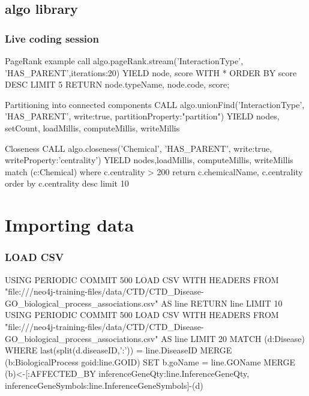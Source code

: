 \documentclass[12pt]{beamer}
\begin{document}
    \subsection{algo library}
    \begin{frame}
        \frametitle{Live coding session}
        \begin{block}{PageRank example}
            call algo.pageRank.stream('InteractionType', 'HAS\_PARENT',{iterations:20}) YIELD node, score
            WITH * ORDER BY score DESC LIMIT 5
            RETURN node.typeName, node.code, score;
        \end{block}
        \begin{block}{Partitioning into connected components}
            CALL algo.unionFind('InteractionType', 'HAS\_PARENT', {write:true, partitionProperty:"partition"})
            YIELD nodes, setCount, loadMillis, computeMillis, writeMillis
        \end{block}
        \begin{block}{Closeness}%
            CALL algo.closeness('Chemical', 'HAS\_PARENT', {write:true, writeProperty:'centrality'})
            YIELD nodes,loadMillis, computeMillis, writeMillis\\
            
            match (c:Chemical) where c.centrality > 200 return c.chemicalName, c.centrality order by c.centrality desc limit 10
        \end{block}
    \end{frame}
    
    \section{Importing data}
    \begin{frame}
        \frametitle{LOAD CSV}
        USING PERIODIC COMMIT 500
        LOAD CSV WITH HEADERS FROM "file:///neo4j-training-files/data/CTD/CTD\_Disease-GO\_biological\_process\_associations.csv" AS line
        RETURN line LIMIT 10\\
        
        USING PERIODIC COMMIT 500
        LOAD CSV WITH HEADERS FROM "file:///neo4j-training-files/data/CTD/CTD\_Disease-GO\_biological\_process\_associations.csv" AS line LIMIT 20
        MATCH (d:Disease) WHERE last(split(d.diseaseID,':')) = line.DiseaseID 
        MERGE (b:BiologicalProcess {goid:line.GOID}) SET b.goName = line.GOName
        MERGE (b)<-[:AFFECTED\_BY {inferenceGeneQty:line.InferenceGeneQty, inferenceGeneSymbols:line.InferenceGeneSymbols}]-(d)
    \end{frame}
\end{document}
